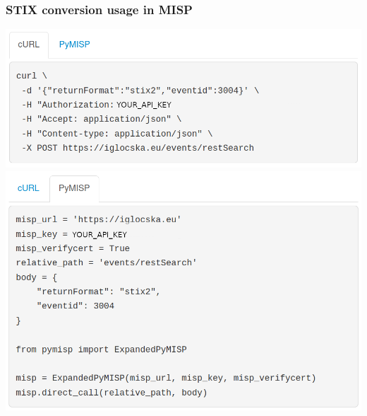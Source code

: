 \begin{frame}
    \frametitle{STIX conversion usage in MISP}
    \centering
    \includegraphics[scale=0.235]{images/simple_rest_curl.png} \\
    \includegraphics[scale=0.235]{images/simple_rest_pymisp.png}
\end{frame}

